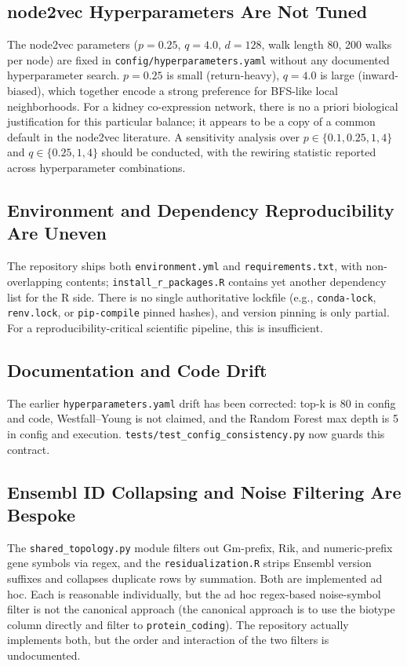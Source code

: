 \documentclass[11pt]{article}
\newcommand{\code}[1]{\texttt{#1}}
\begin{document}
\subsection{node2vec Hyperparameters Are Not Tuned}
The node2vec parameters ($p{=}0.25$, $q{=}4.0$, $d{=}128$, walk length 80, 200 walks per node) are fixed in \code{config/hyperparameters.yaml} without any documented hyperparameter search. $p{=}0.25$ is small (return-heavy), $q{=}4.0$ is large (inward-biased), which together encode a strong preference for BFS-like local neighborhoods. For a kidney co-expression network, there is no a priori biological justification for this particular balance; it appears to be a copy of a common default in the node2vec literature. A sensitivity analysis over $p \in \{0.1, 0.25, 1, 4\}$ and $q \in \{0.25, 1, 4\}$ should be conducted, with the rewiring statistic reported across hyperparameter combinations.

\subsection{Environment and Dependency Reproducibility Are Uneven}
The repository ships both \code{environment.yml} and \code{requirements.txt}, with non-overlapping contents; \code{install\_r\_packages.R} contains yet another dependency list for the R side. There is no single authoritative lockfile (e.g., \code{conda-lock}, \code{renv.lock}, or \code{pip-compile} pinned hashes), and version pinning is only partial. For a reproducibility-critical scientific pipeline, this is insufficient.

\subsection{Documentation and Code Drift}
The earlier \code{hyperparameters.yaml} drift has been corrected: top-k is 80 in config and code, Westfall--Young is not claimed, and the Random Forest max depth is 5 in config and execution. \code{tests/test\_config\_consistency.py} now guards this contract.

\subsection{Ensembl ID Collapsing and Noise Filtering Are Bespoke}
The \code{shared\_topology.py} module filters out Gm-prefix, Rik, and numeric-prefix gene symbols via regex, and the \code{residualization.R} strips Ensembl version suffixes and collapses duplicate rows by summation. Both are implemented ad hoc. Each is reasonable individually, but the ad hoc regex-based noise-symbol filter is not the canonical approach (the canonical approach is to use the biotype column directly and filter to \code{protein\_coding}). The repository actually implements both, but the order and interaction of the two filters is undocumented.
\end{document}
